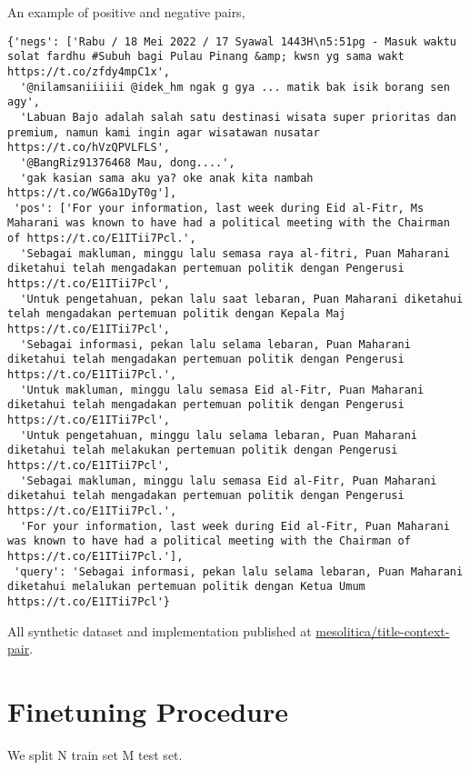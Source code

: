 \documentclass[preprint]{article}
\begin{document}
An example of positive and negative pairs,

\begin{lstlisting}[breaklines=true]
{'negs': ['Rabu / 18 Mei 2022 / 17 Syawal 1443H\n5:51pg - Masuk waktu solat fardhu #Subuh bagi Pulau Pinang &amp; kwsn yg sama wakt https://t.co/zfdy4mpC1x',
  '@nilamsaniiiiii @idek_hm ngak g gya ... matik bak isik borang sen agy',
  'Labuan Bajo adalah salah satu destinasi wisata super prioritas dan premium, namun kami ingin agar wisatawan nusatar https://t.co/hVzQPVLFLS',
  '@BangRiz91376468 Mau, dong....',
  'gak kasian sama aku ya? oke anak kita nambah https://t.co/WG6a1DyT0g'],
 'pos': ['For your information, last week during Eid al-Fitr, Ms Maharani was known to have had a political meeting with the Chairman of https://t.co/E1ITii7Pcl.',
  'Sebagai makluman, minggu lalu semasa raya al-fitri, Puan Maharani diketahui telah mengadakan pertemuan politik dengan Pengerusi https://t.co/E1ITii7Pcl',
  'Untuk pengetahuan, pekan lalu saat lebaran, Puan Maharani diketahui telah mengadakan pertemuan politik dengan Kepala Maj https://t.co/E1ITii7Pcl',
  'Sebagai informasi, pekan lalu selama lebaran, Puan Maharani diketahui telah mengadakan pertemuan politik dengan Pengerusi https://t.co/E1ITii7Pcl.',
  'Untuk makluman, minggu lalu semasa Eid al-Fitr, Puan Maharani diketahui telah mengadakan pertemuan politik dengan Pengerusi https://t.co/E1ITii7Pcl',
  'Untuk pengetahuan, minggu lalu selama lebaran, Puan Maharani diketahui telah melakukan pertemuan politik dengan Pengerusi https://t.co/E1ITii7Pcl',
  'Sebagai makluman, minggu lalu semasa Eid al-Fitr, Puan Maharani diketahui telah mengadakan pertemuan politik dengan Pengerusi https://t.co/E1ITii7Pcl.',
  'For your information, last week during Eid al-Fitr, Puan Maharani was known to have had a political meeting with the Chairman of https://t.co/E1ITii7Pcl.'],
 'query': 'Sebagai informasi, pekan lalu selama lebaran, Puan Maharani diketahui melalukan pertemuan politik dengan Ketua Umum https://t.co/E1ITii7Pcl'}
\end{lstlisting}

All synthetic dataset and implementation published at \href{https://huggingface.co/datasets/mesolitica/title-context-pair}{mesolitica/title-context-pair}.

\section{Finetuning Procedure}

We split N train set M test set.
\end{document}

